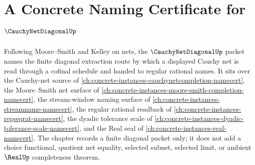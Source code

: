 \chapter{A Concrete Naming Certificate for $\CauchyNetDiagonalUp$}
\label{ch:concrete-instances-cauchy-net-diagonal-namecert}

Following Moore--Smith and Kelley on nets, the $\CauchyNetDiagonalUp$ packet names the finite diagonal extraction route by which a displayed Cauchy net is read through a cofinal schedule and handed to regular rational names. It sits over the Cauchy-net source of \autoref{ch:concrete-instances-cauchynetcompletion-namecert}, the Moore--Smith net surface of \autoref{ch:concrete-instances-moore-smith-completion-namecert}, the stream-window naming surface of \autoref{ch:concrete-instances-streamname-namecert}, the regular rational readback of \autoref{ch:concrete-instances-regseqrat-namecert}, the dyadic tolerance scale of \autoref{ch:concrete-instances-dyadic-tolerance-scale-namecert}, and the Real seal of \autoref{ch:concrete-instances-real-namecert}. The chapter records a finite diagonal packet only; it does not add a choice functional, quotient net equality, selected subnet, selected limit, or ambient $\RealUp$ completeness theorem.

